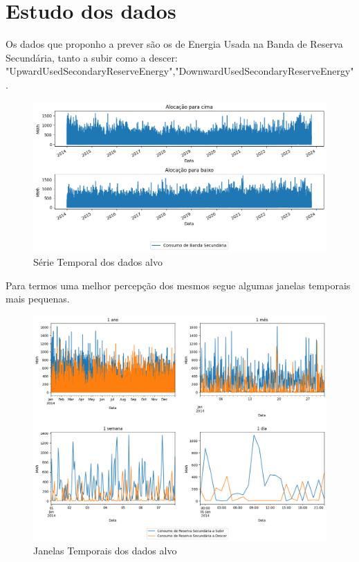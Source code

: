 
\section{Estudo dos dados}

Os dados que proponho a prever são os de Energia Usada na Banda de Reserva Secundária, tanto a subir como a descer: "UpwardUsedSecondaryReserveEnergy","DownwardUsedSecondaryReserveEnergy".\\



\begin{figure}[H]
  \centering
  \includegraphics[width=\textwidth]{plots/consumo_originais.png}
  \caption{Série Temporal dos dados alvo}
  \label{fig:targettimeseries}
\end{figure}


Para termos uma melhor percepção dos mesmos segue algumas janelas temporais mais pequenas.

\begin{figure}[H]
  \centering
  \includegraphics[width=\textwidth]{plots/target_timeseries_windows.png}
  \caption{Janelas Temporais dos dados alvo}
  \label{fig:targettimeserieswindows}
\end{figure}


